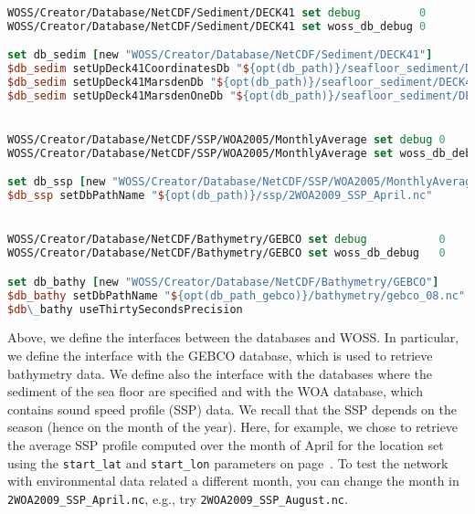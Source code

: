 \documentclass[11pt]{article}
\begin{document}
{\scriptsize\tt
\begin{lstlisting}[language=tcl,showstringspaces=false,breaklines=true]
WOSS/Creator/Database/NetCDF/Sediment/DECK41 set debug         0
WOSS/Creator/Database/NetCDF/Sediment/DECK41 set woss_db_debug 0

set db_sedim [new "WOSS/Creator/Database/NetCDF/Sediment/DECK41"]
$db_sedim setUpDeck41CoordinatesDb "${opt(db_path)}/seafloor_sediment/DECK41_coordinates.nc"
$db_sedim setUpDeck41MarsdenDb "${opt(db_path)}/seafloor_sediment/DECK41_mardsen_square.nc"
$db_sedim setUpDeck41MarsdenOneDb "${opt(db_path)}/seafloor_sediment/DECK41_mardsen_one_degree.nc"


WOSS/Creator/Database/NetCDF/SSP/WOA2005/MonthlyAverage set debug 0
WOSS/Creator/Database/NetCDF/SSP/WOA2005/MonthlyAverage set woss_db_debug 0

set db_ssp [new "WOSS/Creator/Database/NetCDF/SSP/WOA2005/MonthlyAverage"]
$db_ssp setDbPathName "${opt(db_path)}/ssp/2WOA2009_SSP_April.nc"


WOSS/Creator/Database/NetCDF/Bathymetry/GEBCO set debug           0
WOSS/Creator/Database/NetCDF/Bathymetry/GEBCO set woss_db_debug   0

set db_bathy [new "WOSS/Creator/Database/NetCDF/Bathymetry/GEBCO"]
$db_bathy setDbPathName "${opt(db_path_gebco)}/bathymetry/gebco_08.nc"
$db\_bathy useThirtySecondsPrecision
\end{lstlisting}
}


Above, we define the interfaces between the databases and WOSS. In particular, we define the interface with the GEBCO database, which is used to retrieve bathymetry data. We define also the interface with the databases where the sediment of the sea floor are specified and with the WOA database, which contains sound speed profile (SSP) data. 
We recall that the SSP depends on the season (hence on the month of the year). Here, for example, we chose to retrieve the average SSP profile computed over the month of April for the location set using the {\tt start\_lat} and {\tt start\_lon} parameters on page~\pageref{latlon_set}. To test the network with environmental data related a different month, you can change the month in {\tt 2WOA2009\_SSP\_April.nc}, e.g., try {\tt 2WOA2009\_SSP\_August.nc}. \\ \  \\

\clearpage
\end{document}
